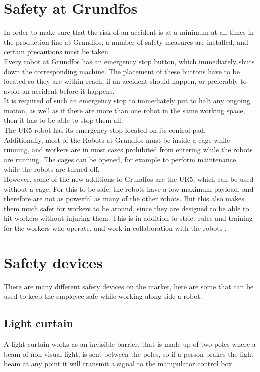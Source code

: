\section{Safety at Grundfos}\label{ch:Safety at Grundfos}
In order to make sure that the risk of an accident is at a minimum at all times in the production line at Grundfos, a number of safety measures are installed, and certain precautions must be taken.\\

Every robot at Grundfos has an emergency stop button, which immediately shuts down the corresponding machine. The placement of these buttons have to be located so they are within reach, if an accident should happen, or preferably to avoid an accident before it happens. \\
It is required of such an emergency stop to immediately put to halt any ongoing motion, as well as if there are more than one robot in the same working space, then it has to be able to stop them all.\\
The UR5 robot has its emergency stop located on its control pad.\\

Additionally, most of the Robots at Grundfos must be inside a cage while running, and workers are in most cases prohibited from entering while the robots are running. The cages can be opened, for example to perform maintenance, while the robots are turned off.\\

However, some of the new additions to Grundfos are the UR5, which can be used without a cage. For this to be safe, the robots have a low maximum payload, and therefore are not as powerful as many of the other robots. But this also makes them much safer for workers to be around, since they are designed to be able to hit workers without injuring them. This is in addition to strict rules and training for the workers who operate, and work in collaboration with the robots \cite{SafetyatGrundfos}. \\

\section{Safety devices}\label{SafetyDevices}
There are many different safety devices  on the market, here are some that can be used to keep the employee safe while working along side a robot.\\

\subsection{Light curtain}
A light curtain works as an invisible barrier, that is made up of two poles where a beam of non-visual light, is sent between the poles, so if a person brakes the light beam at any point it will transmit a signal to the manipulator control box\cite{ligthcurtian}.\\

